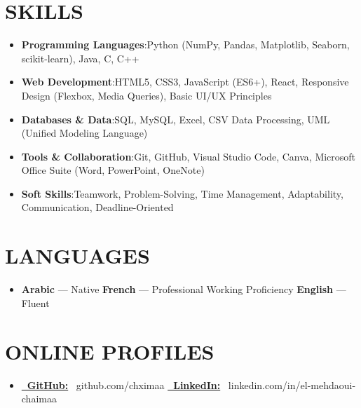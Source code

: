 \documentclass[a4paper,11pt]{article}
\newcommand{\resumeItem}[2]{
  \item{
    \textbf{#1}{:\hspace{0.5mm}#2 \vspace{-0.5mm}}
  }
}
\newcommand{\resumeSubItem}[2]{\resumeItem{#1}{#2}\vspace{-4pt}}
\newcommand{\resumeHeadingSkillStart}{\begin{itemize}[leftmargin=*,itemsep=1.7mm, rightmargin=2ex]}
\newcommand{\resumeItemListStart}{\begin{justify}\begin{itemize}[leftmargin=3ex, rightmargin=2ex, noitemsep,labelsep=1.2mm,itemsep=0mm]\small}
\newcommand{\resumeHeadingSkillEnd}{\end{itemize}\vspace{-2mm}}
\newcommand{\resumeItemListEnd}{\end{itemize}\end{justify}\vspace{-2mm}}
\begin{document}
\section{SKILLS}
\resumeHeadingSkillStart
  \resumeSubItem{Programming Languages}
    {Python (NumPy, Pandas, Matplotlib, Seaborn, scikit-learn), Java, C, C++}
  \resumeSubItem{Web Development}
    {HTML5, CSS3, JavaScript (ES6+), React, Responsive Design (Flexbox, Media Queries), Basic UI/UX Principles}
  \resumeSubItem{Databases \& Data}
    {SQL, MySQL, Excel, CSV Data Processing, UML (Unified Modeling Language)}
  \resumeSubItem{Tools \& Collaboration}
    {Git, GitHub, Visual Studio Code, Canva, Microsoft Office Suite (Word, PowerPoint, OneNote)}
  \resumeSubItem{Soft Skills}
    {Teamwork, Problem-Solving, Time Management, Adaptability, Communication, Deadline-Oriented}
\resumeHeadingSkillEnd

\section{LANGUAGES}
\resumeItemListStart
  \item {\textbf{Arabic} — Native \hspace{2em} \textbf{French} — Professional Working Proficiency \hspace{2em} \textbf{English} — Fluent}
\resumeItemListEnd
\vspace{-4mm}

\section{ONLINE PROFILES}
\resumeItemListStart
  \item {
    \href{https://github.com/chximaa}{\textbf{\faGithub \ GitHub:}} \ github.com/chximaa
    \hspace{3em}
    \href{https://www.linkedin.com/in/el-mehdaoui-chaimaa}{\textbf{\faLinkedin \ LinkedIn:}} \ linkedin.com/in/el-mehdaoui-chaimaa
  }
\resumeItemListEnd

\end{document}
